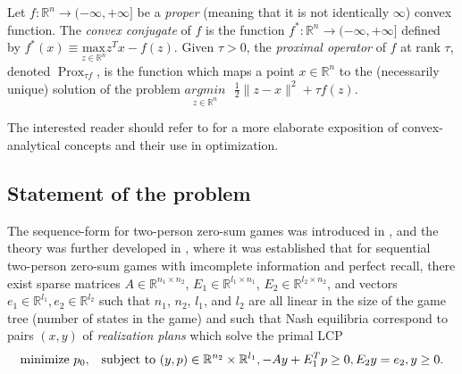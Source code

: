 \documentclass{article} %
\DeclareMathOperator{\prox}{Prox}
\begin{document}
Let $f : \mathbb{R}^n \rightarrow (-\infty, +\infty]$ be a
  \textit{proper} (meaning that it is not identically $\infty$) convex
  function.
The \textit{convex conjugate} of $f$ is the function $f^*:
\mathbb{R}^n \rightarrow (-\infty, +\infty]$ defined by $f^*(x) \equiv
  \underset{z \in \mathbb{R}^n}{\text{max}}\text{}z^Tx - f(z)$.
Given $\tau > 0$, the \textit{proximal operator}
of $f$ at rank $\tau$, denoted $\prox_{\tau f}$, is the
function which maps a point $x \in \mathbb{R}^n$ to the (necessarily
unique) solution of the problem $\underset{z \in
  \mathbb{R}^n}{argmin}\text{ }\frac{1}{2}\|z - x\|^2 + \tau f(z)$.

The interested reader should refer to
\cite{rockafellar1997convex,combettes2011proximal} for a more
elaborate exposition of convex-analytical concepts and their use in
optimization.

\subsection{Statement of the problem}
The sequence-form for two-person zero-sum games was introduced in
\cite{koller1992complexity}, and the theory was further developed in
\cite{von1996efficient,vonequilibrium}, where it was established that
for sequential two-person zero-sum games with imcomplete information
and perfect recall, there exist sparse matrices $A \in \mathbb{R}^{n_1
  \times n_2}$, $E_1 \in \mathbb{R}^{l_1 \times n_1}$, $E_2 \in
\mathbb{R}^{l_2 \times n_2}$, and vectors $e_1 \in \mathbb{R}^{l_1},
e_2 \in \mathbb{R}^{l_2}$ such that $n_1$, $n_2$, $l_1$, and $l_2$ are
all linear in the size of the game tree (number of states in the game)
and such that Nash equilibria correspond to pairs $(x, y)$ of
\textit{realization plans} which solve the primal LCP
\begin{equation}
  \begin{aligned}
     \text{minimize }p_0, \hspace{.5em}\text{ subject to }(y,p) \in
     \mathbb{R}^{n_2} \times \mathbb{R}^{l_1}, -Ay +
    E_1^Tp \geq 0, E_2y = e_2, y \ge 0.
  \end{aligned}
  \label{eq:primal_pb}
\end{equation}
\end{document}
